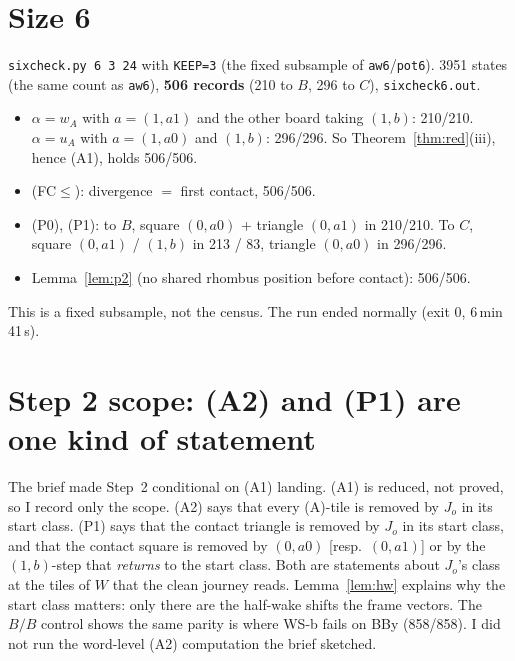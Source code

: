 \documentclass[11pt]{article}
\theoremstyle{definition}\newtheorem{definition}[theorem]{Definition}\newtheorem{remark}[theorem]{Remark}
\begin{document}
\section{Size 6}\label{sec:six}
\texttt{sixcheck.py 6 3 24} with \texttt{KEEP=3} (the fixed subsample of \texttt{aw6}/\texttt{pot6}). 3951 states (the same count as \texttt{aw6}), \textbf{506 records} (210 to $B$, 296 to $C$), \texttt{sixcheck6.out}.
\begin{itemize}
\item $\alpha=w_A$ with $a=(1,a1)$ and the other board taking $(1,b)$: 210/210. $\alpha=u_A$ with $a=(1,a0)$ and $(1,b)$: 296/296. So Theorem~\ref{thm:red}(iii), hence (A1), holds 506/506.
\item (FC$\le$): divergence $=$ first contact, 506/506.
\item (P0), (P1): to $B$, square $(0,a0)$ + triangle $(0,a1)$ in 210/210. To $C$, square $(0,a1)$ / $(1,b)$ in 213 / 83, triangle $(0,a0)$ in 296/296.
\item Lemma~\ref{lem:p2} (no shared rhombus position before contact): 506/506.
\end{itemize}
This is a fixed subsample, not the census. The run ended normally (exit 0, 6\,min\,41\,s).

\section{Step 2 scope: (A2) and (P1) are one kind of statement}\label{sec:A2}
The brief made Step~2 conditional on (A1) landing. (A1) is reduced, not proved, so I record only the scope.
(A2) says that every (A)-tile is removed by $J_o$ in its start class. (P1) says that the contact triangle is removed by $J_o$ in its start class, and that the contact square is removed by $(0,a0)$ [resp.\ $(0,a1)$] or by the $(1,b)$-step that \emph{returns} to the start class.
Both are statements about $J_o$'s class at the tiles of $W$ that the clean journey reads. Lemma~\ref{lem:hw} explains why the start class matters: only there are the half-wake shifts the frame vectors.
The $B/B$ control shows the same parity is where WS-b fails on BBy (858/858). I did not run the word-level (A2) computation the brief sketched.
\end{document}
